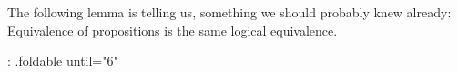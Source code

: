 The following lemma is telling us, something we should probably knew already:
Equivalence of propositions is the same logical equivalence.

{: .foldable until="6"}
\begin{code}%
%
\>[2]\<%
\\
\>[2][@{}l@{\AgdaIndent{0}}]%
\>[4]\AgdaSymbol{:}\AgdaSpace{}%
\AgdaSymbol{\{}\AgdaSpace{}%
\AgdaSymbol{:}\AgdaSpace{}%
\AgdaSpace{}%
\AgdaSymbol{\}}\AgdaSpace{}%
\AgdaSymbol{\{}\AgdaSpace{}%
\AgdaSymbol{:}\AgdaSpace{}%
\AgdaSpace{}%
\AgdaSymbol{\}}\<%
\\
%
\>[4]\AgdaSpace{}%
\AgdaSpace{}%
\<%
\\
%
\>[4]\AgdaSpace{}%
\AgdaSpace{}%
\<%
\\
%
\>[4]\AgdaComment{-------------------}\<%
\\
%
\>[4]\AgdaSpace{}%
\AgdaSymbol{(}\AgdaSpace{}%
\AgdaSpace{}%
\AgdaSymbol{)}\AgdaSpace{}%
\AgdaSpace{}%
\AgdaSymbol{(}\AgdaSpace{}%
\AgdaSpace{}%
\AgdaSymbol{)}\<%
\\
%
\\[\AgdaEmptyExtraSkip]%
%
\>[2]\AgdaSpace{}%
\AgdaSymbol{\{}\AgdaSpace{}%
\AgdaSymbol{=}\AgdaSpace{}%
\AgdaSymbol{\}}\AgdaSpace{}%
\AgdaSymbol{\{}\AgdaSymbol{\}}\AgdaSpace{}%
\AgdaSpace{}%
%
\>[53]\AgdaSymbol{=}\AgdaSpace{}%
\AgdaSpace{}%
\AgdaSpace{}%
\AgdaSymbol{(}\AgdaSpace{}%
\AgdaOperator{\AgdaInductiveConstructor{,}}\AgdaSpace{}%
\AgdaSpace{}%
\AgdaOperator{\AgdaInductiveConstructor{,}}\AgdaSpace{}%
\AgdaSymbol{)}\<%
\\
\>[2][@{}l@{\AgdaIndent{0}}]%
\>[3]\<%
\\
\>[3][@{}l@{\AgdaIndent{0}}]%
\>[4]\AgdaSpace{}%
\AgdaSymbol{:}\AgdaSpace{}%
\AgdaSymbol{(}\AgdaSpace{}%
\AgdaSpace{}%
\AgdaSymbol{)}\AgdaSpace{}%
\AgdaSpace{}%
\AgdaSymbol{(}\AgdaSpace{}%
\AgdaSpace{}%

\end{code}
